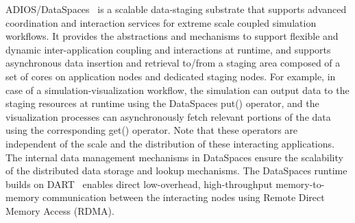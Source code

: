 


ADIOS/DataSpaces~\cite{ADIOS:Docan:cluster12} is a scalable data-staging substrate that supports advanced coordination and interaction services for extreme scale coupled simulation workflows. It provides the abstractions and mechanisms to support flexible and dynamic inter-application coupling and interactions at runtime, and supports asynchronous data insertion and retrieval to/from a staging area composed of a set of cores on application nodes and dedicated staging nodes. For example, in case of a simulation-visualization workflow, the simulation can output data to the staging resources at runtime using the DataSpaces put() operator, and the visualization processes can asynchronously fetch relevant portions of the data using the corresponding get() operator. Note that these operators are independent of the scale and the distribution of these interacting applications. The internal data management mechanisms in DataSpaces ensure the scalability of the distributed data storage and lookup mechanisms. The DataSpaces runtime builds on DART~\cite{ADIOS:Docan:ccpe10} enables direct low-overhead, high-throughput memory-to-memory communication between the interacting nodes using Remote Direct Memory Access (RDMA). 

